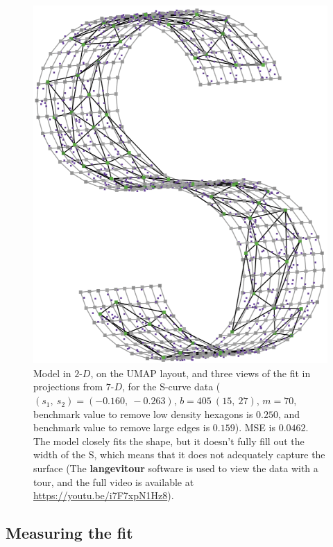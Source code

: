 \documentclass[
  12pt]{article}
\newcommand\gD{$2\text{-}D$}
\begin{document}
\begin{figure}[H]
%
\begin{minipage}{0.25\linewidth}
\includegraphics{figures/scurve/sc_umap_best_3.png}\end{minipage}%

\caption{\label{fig-scurve-sc}Model in \gD{}, on the UMAP layout, and
three views of the fit in projections from \(7\text{-}D\), for the
S-curve data (\((s_1, \ s_2) = (-0.160, \ -0.263)\),
\(b = 405 \  (15, \ 27)\), \(m = 70\), benchmark value to remove low
density hexagons is \(0.250\), and benchmark value to remove large edges
is \(0.159\)). MSE is \(0.0462\). The model closely fits the shape, but
it doesn't fully fill out the width of the S, which means that it does
not adequately capture the surface (The \textbf{langevitour} software is
used to view the data with a tour, and the full video is available at
\url{https://youtu.be/i7F7xpN1Hz8}).}

\end{figure}%

\subsection{Measuring the fit}\label{sec-summary}
\end{document}
